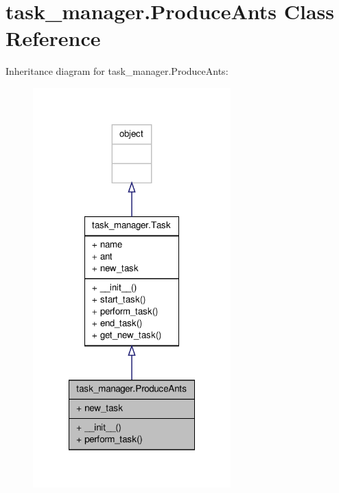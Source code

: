 \hypertarget{classtask__manager_1_1ProduceAnts}{\section{task\+\_\+manager.\+Produce\+Ants Class Reference}
\label{classtask__manager_1_1ProduceAnts}
}


Inheritance diagram for task\+\_\+manager.\+Produce\+Ants\+:
\nopagebreak
\begin{figure}[H]
\begin{center}
\leavevmode
\includegraphics[width=216pt]{classtask__manager_1_1ProduceAnts__inherit__graph}
\end{center}
\end{figure}


